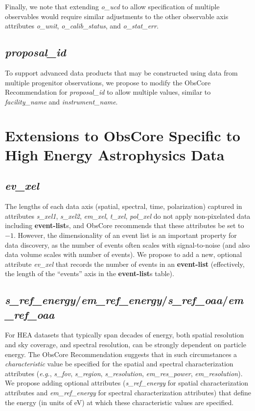 \documentclass[11pt,a4paper]{ivoa}
\begin{document}
Finally, we note that extending {\em o\_ucd\/} to allow specification of multiple observables would require similar adjustments to the other observable axis attributes {\em o\_unit}, {\em o\_calib\_status}, and {\em o\_stat\_err}.


\subsection{{\em proposal\_id}}

To support advanced data products that may be constructed using data from multiple progenitor observations, we propose to modify the ObsCore Recommendation for {\em proposal\_id\/} to allow multiple values, similar to {\em facility\_name\/} and {\em instrument\_name}.


\section{Extensions to ObsCore Specific to High Energy Astrophysics Data}
\label{sec:obscoreext}

\subsection{{\em ev\_xel}}

The lengths of each data axis (spatial, spectral, time, polarization) captured in attributes {\em s\_xel1\/}, {\em s\_xel2\/}, {\em em\_xel\/}, {\em t\_xel\/}, {\em pol\_xel\/} do not apply non-pixelated data including {\bf event-list}s, and ObsCore recommends that these attributes be set to $-1$.  However, the dimensionality of an event list is an important property for data discovery, as the number of events often scales with signal-to-noise (and also data volume scales with number of events).  We propose to add a new, optional attribute {\em ev\_xel\/} that records the number of events in an {\bf event-list} (effectively, the length of the ``events'' axis in the {\bf event-list}s table).

\subsection{{\em s\_ref\_energy\/}/{\em em\_ref\_energy\/}/{\em s\_ref\_oaa\/}/{\em em\_ref\_oaa}}

For \gls{HEA} datasets that typically span decades of energy, both spatial resolution and sky coverage, and spectral resolution, can be strongly dependent on particle energy. The ObsCore Recommendation suggests that in such circumstances a {\em characteristic\/} value be specified for the spatial and spectral characterization attributes ({\em e.g.\/}, {\em s\_fov\/}, {\em s\_region\/}, {\em s\_resolution\/}, {\em em\_res\_power\/}, {\em em\_resolution\/}). We propose adding optional attributes ({\em s\_ref\_energy\/} for spatial characterization attributes and {\em em\_ref\_energy\/} for spectral characterization attributes) that define the energy (in units of eV) at which these characteristic values are specified.
\end{document}
